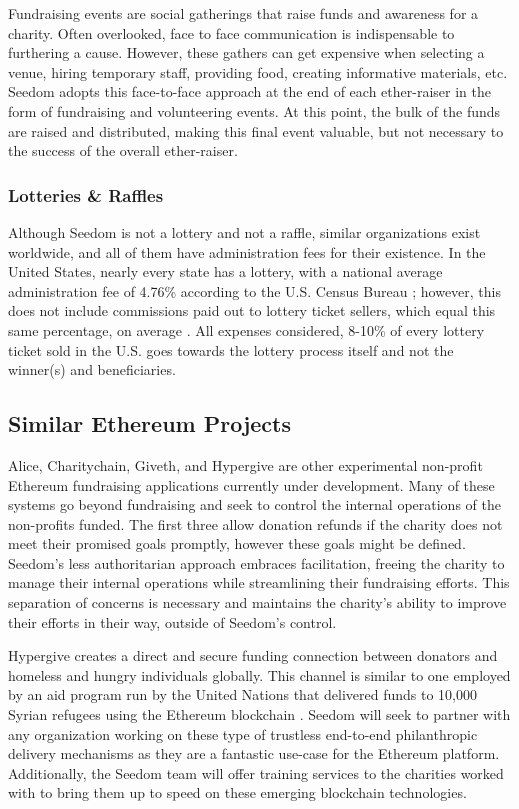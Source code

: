 \documentclass[11pt]{article}
\begin{document}
Fundraising events are social gatherings that raise funds and awareness for a charity. Often overlooked, face to face communication is indispensable to furthering a cause. However, these gathers can get expensive when selecting a venue, hiring temporary staff, providing food, creating informative materials, etc. Seedom adopts this face-to-face approach at the end of each ether-raiser in the form of fundraising and volunteering events. At this point, the bulk of the funds are raised and distributed, making this final event valuable, but not necessary to the success of the overall ether-raiser.

\subsubsection{Lotteries \& Raffles}

Although Seedom is not a lottery and not a raffle, similar organizations exist worldwide, and all of them have administration fees for their existence. In the United States, nearly every state has a lottery, with a national average administration fee of 4.76\% according to the U.S. Census Bureau \cite{3}; however, this does not include commissions paid out to lottery ticket sellers, which equal this same percentage, on average \cite{4}. All expenses considered, 8-10\% of every lottery ticket sold in the U.S. goes towards the lottery process itself and not the winner(s) and beneficiaries.

\subsection{Similar Ethereum Projects}

Alice, Charitychain, Giveth, and Hypergive are other experimental non-profit Ethereum fundraising applications currently under development. Many of these systems go beyond fundraising and seek to control the internal operations of the non-profits funded. The first three allow donation refunds if the charity does not meet their promised goals promptly, however these goals might be defined. Seedom's less authoritarian approach embraces facilitation, freeing the charity to manage their internal operations while streamlining their fundraising efforts. This separation of concerns is necessary and maintains the charity's ability to improve their efforts in their way, outside of Seedom's control.

Hypergive creates a direct and secure funding connection between donators and homeless and hungry individuals globally. This channel is similar to one employed by an aid program run by the United Nations that delivered funds to 10,000 Syrian refugees using the Ethereum blockchain \cite{6}. Seedom will seek to partner with any organization working on these type of trustless end-to-end philanthropic delivery mechanisms as they are a fantastic use-case for the Ethereum platform. Additionally, the Seedom team will offer training services to the charities worked with to bring them up to speed on these emerging blockchain technologies.
\end{document}
